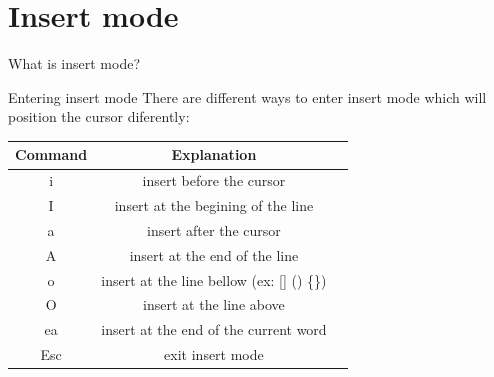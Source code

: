 \documentclass{beamer}
\begin{document}
\section{Insert mode}
\begin{frame}{What is insert mode?}
  \begin{figure}[htp] 
    \centering
  \end{figure}
\end{frame}
\begin{frame}{Entering insert mode}
  There are different ways to enter insert mode which will position the cursor diferently:
  \begin{center}
    \begin{tabular}{ |c|c|c| } 
      \hline
      Command & Explanation \\ \hline
      i & insert before the cursor \\ \hline
      I & insert at the begining of the line \\ \hline
      a & insert after the cursor \\ \hline
      A & insert at the end of the line \\ \hline
      o & insert at the line bellow (ex: [] () \{\}) \\ \hline
      O & insert at the line above \\ \hline
      ea & insert at the end of the current word \\ \hline
      Esc & exit insert mode \\ \hline
    \end{tabular}
  \end{center}
\end{frame}     
\end{document}
